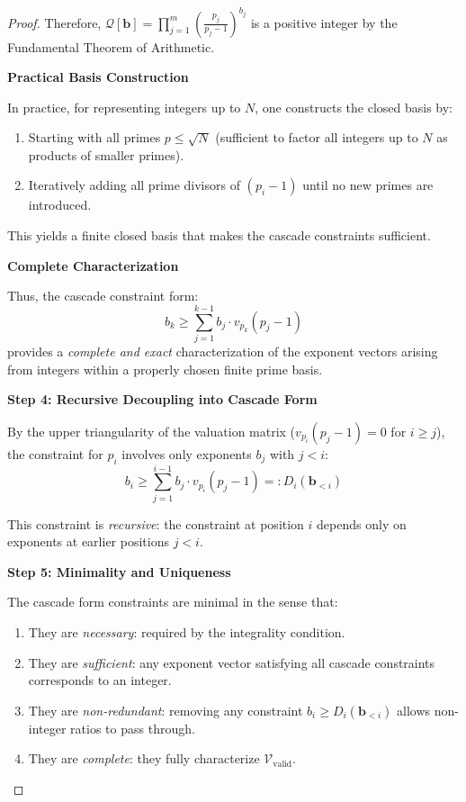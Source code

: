 \begin{proof}
Therefore, $\mathcal{Q}[\mathbf{b}] = \prod_{j=1}^m \left(\frac{p_j}{p_j-1}\right)^{b_j}$ is a positive integer by the Fundamental Theorem of Arithmetic.

\noindent \textbf{Practical Basis Construction}

In practice, for representing integers up to $N$, one constructs the closed basis by:
\begin{enumerate}
\item Starting with all primes $p \leq \sqrt{N}$ (sufficient to factor all integers up to $N$ as products of smaller primes).
\item Iteratively adding all prime divisors of $(p_i - 1)$ until no new primes are introduced.
\end{enumerate}

This yields a finite closed basis that makes the cascade constraints sufficient.

\noindent \textbf{Complete Characterization}

Thus, the cascade constraint form:
\begin{equation}
b_k \geq \sum_{j=1}^{k-1} b_j \cdot v_{p_k}(p_j - 1)
\end{equation}
provides a \emph{complete and exact} characterization of the exponent vectors arising from integers within a properly chosen finite prime basis.

\noindent \textbf{Step 4: Recursive Decoupling into Cascade Form}

By the upper triangularity of the valuation matrix ($v_{p_i}(p_j - 1) = 0$ for $i \geq j$), the constraint for $p_i$ involves only exponents $b_j$ with $j < i$:
\begin{equation}
b_i \geq \sum_{j=1}^{i-1} b_j \cdot v_{p_i}(p_j - 1) =: D_i(\mathbf{b}_{<i})
\end{equation}

This constraint is \emph{recursive}: the constraint at position $i$ depends only on exponents at earlier positions $j < i$.

\noindent \textbf{Step 5: Minimality and Uniqueness}

The cascade form constraints are minimal in the sense that:
\begin{enumerate}
\item They are \emph{necessary}: required by the integrality condition.
\item They are \emph{sufficient}: any exponent vector satisfying all cascade constraints corresponds to an integer.
\item They are \emph{non-redundant}: removing any constraint $b_i \geq D_i(\mathbf{b}_{<i})$ allows non-integer ratios to pass through.
\item They are \emph{complete}: they fully characterize $\mathcal{V}_{\text{valid}}$.
\end{enumerate}


\end{proof}
